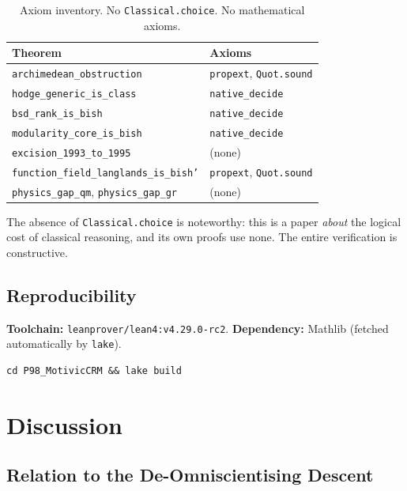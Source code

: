 \documentclass[11pt,a4paper]{article}
\theoremstyle{plain}
\theoremstyle{definition}
\begin{document}
\begin{table}[ht]
\centering
\begin{tabular}{@{}ll@{}}
\toprule
\textbf{Theorem} & \textbf{Axioms} \\
\midrule
\texttt{archimedean\_obstruction} & \texttt{propext}, \texttt{Quot.sound} \\
\texttt{hodge\_generic\_is\_class} & \texttt{native\_decide} \\
\texttt{bsd\_rank\_is\_bish} & \texttt{native\_decide} \\
\texttt{modularity\_core\_is\_bish} & \texttt{native\_decide} \\
\texttt{excision\_1993\_to\_1995} & (none) \\
\texttt{function\_field\_langlands\_is\_bish'} & \texttt{propext}, \texttt{Quot.sound} \\
\texttt{physics\_gap\_qm}, \texttt{physics\_gap\_gr} & (none) \\
\bottomrule
\end{tabular}
\caption{Axiom inventory. No \texttt{Classical.choice}. No mathematical axioms.}
\label{tab:axioms}
\end{table}

The absence of \texttt{Classical.choice} is noteworthy: this is a paper \emph{about} the logical cost of classical reasoning, and its own proofs use none. The entire verification is constructive.

\subsection{Reproducibility}

\textbf{Toolchain:} \texttt{leanprover/lean4:v4.29.0-rc2}.
\textbf{Dependency:} Mathlib (fetched automatically by \texttt{lake}).

\begin{verbatim}
cd P98_MotivicCRM && lake build
\end{verbatim}

\section{Discussion}\label{sec:discussion}

\subsection{Relation to the De-Omniscientising Descent}
\end{document}
